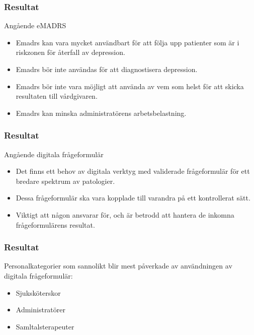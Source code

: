 \documentclass[english]{beamer}
\begin{document}
\begin{frame}
\frametitle{Resultat}
Ang{\aa}ende eMADRS
\begin{itemize}
\item Emadrs kan vara mycket anv{\"a}ndbart f{\"o}r att f{\"o}lja upp patienter som {\"a}r i riskzonen f{\"o}r {\aa}terfall av depression.
\item Emadrs b{\"o}r inte anv{\"a}ndas f{\"o}r att diagnostisera depression.
\item Emadrs b{\"o}r inte vara m{\"o}jligt att anv{\"a}nda av vem som helst f{\"o}r att skicka resultaten till v{\aa}rdgivaren. 
\item Emadrs kan minska administrat{\"o}rens arbetsbelastning. 
\end{itemize}
\end{frame}

\begin{frame}
\frametitle{Resultat}
Ang{\aa}ende digitala fr{\aa}geformul{\"a}r
\begin{itemize}
\item Det finns ett behov av digitala verktyg med validerade fr{\aa}geformul{\"a}r f{\"o}r ett bredare spektrum av patologier.
\item  Dessa fr{\aa}geformul{\"a}r ska vara kopplade till varandra p{\aa} ett kontrollerat s{\"a}tt. 
\item  Viktigt att n{\aa}gon ansvarar f{\"o}r, och {\"a}r betrodd att hantera de inkomna fr{\aa}geformul{\"a}rens resultat. 
\end{itemize}
\end{frame}

\begin{frame}
\frametitle{Resultat}
Personalkategorier som sannolikt blir mest p{\aa}verkade av anv{\"a}ndningen av digitala fr{\aa}geformul{\"a}r:
\begin{itemize}\vspace{-.33em}
\item Sjuksk{\"o}terskor
\item Administrat{\"o}rer
\item Samltalsterapeuter

\end{itemize}
\end{frame}

\end{document}
